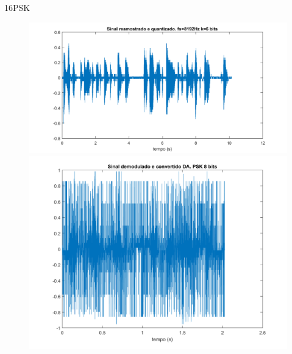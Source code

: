 ﻿\documentclass[mathserif]{beamer}
\begin{document}
	\begin{frame}{16PSK}
		\begin{figure}
			\centering
			\includegraphics[scale=0.3]{../NossoCodigo2/figuras/0quantizado.png}
			\quad
			\includegraphics[scale=0.3]{../NossoCodigo2/figuras/modula16.png}
		\end{figure}
	\end{frame}
\end{document}
